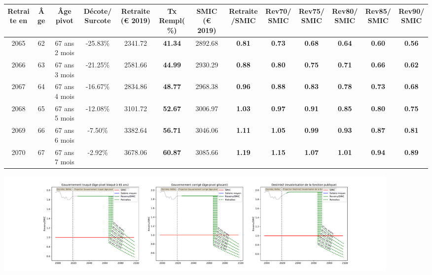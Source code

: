 { \scriptsize \begin{center} 
\begin{tabular}[htb]{|c|c||c|c||c|c||c||c|c|c|c|c|c|} 
\hline 
 Retraite en &  Âge &  Âge pivot &  Décote/Surcote &  Retraite (\euro{} 2019) &  Tx Rempl(\%) &  SMIC (\euro{} 2019) &  Retraite/SMIC &  Rev70/SMIC &  Rev75/SMIC &  Rev80/SMIC &  Rev85/SMIC &  Rev90/SMIC \\ 
\hline \hline 
 2065 &  62 &  67 ans 2 mois &  -25.83\% &  2341.72 &  {\bf 41.34} &  2892.68 &  {\bf {\color{red} 0.81}} &  {\bf {\color{red} 0.73}} &  {\bf {\color{red} 0.68}} &  {\bf {\color{red} 0.64}} &  {\bf {\color{red} 0.60}} &  {\bf {\color{red} 0.56}} \\ 
\hline 
 2066 &  63 &  67 ans 3 mois &  -21.25\% &  2581.66 &  {\bf 44.99} &  2930.29 &  {\bf {\color{red} 0.88}} &  {\bf {\color{red} 0.80}} &  {\bf {\color{red} 0.75}} &  {\bf {\color{red} 0.71}} &  {\bf {\color{red} 0.66}} &  {\bf {\color{red} 0.62}} \\ 
\hline 
 2067 &  64 &  67 ans 4 mois &  -16.67\% &  2834.86 &  {\bf 48.77} &  2968.38 &  {\bf {\color{red} 0.96}} &  {\bf {\color{red} 0.88}} &  {\bf {\color{red} 0.83}} &  {\bf {\color{red} 0.78}} &  {\bf {\color{red} 0.73}} &  {\bf {\color{red} 0.68}} \\ 
\hline 
 2068 &  65 &  67 ans 5 mois &  -12.08\% &  3101.72 &  {\bf 52.67} &  3006.97 &  {\bf 1.03} &  {\bf {\color{red} 0.97}} &  {\bf {\color{red} 0.91}} &  {\bf {\color{red} 0.85}} &  {\bf {\color{red} 0.80}} &  {\bf {\color{red} 0.75}} \\ 
\hline 
 2069 &  66 &  67 ans 6 mois &  -7.50\% &  3382.64 &  {\bf 56.71} &  3046.06 &  {\bf 1.11} &  {\bf 1.05} &  {\bf {\color{red} 0.99}} &  {\bf {\color{red} 0.93}} &  {\bf {\color{red} 0.87}} &  {\bf {\color{red} 0.81}} \\ 
\hline 
 2070 &  67 &  67 ans 7 mois &  -2.92\% &  3678.06 &  {\bf 60.87} &  3085.66 &  {\bf 1.19} &  {\bf 1.15} &  {\bf 1.07} &  {\bf 1.01} &  {\bf {\color{red} 0.94}} &  {\bf {\color{red} 0.89}} \\ 
\hline 
\hline 
\end{tabular} 
\end{center} } 

 \begin{center}\includegraphics[width=0.9\textwidth]{fig/SMPT_2003_22_dest_retraite.pdf}\end{center} \label{fig/SMPT_2003_22_dest_retraite.pdf} 

